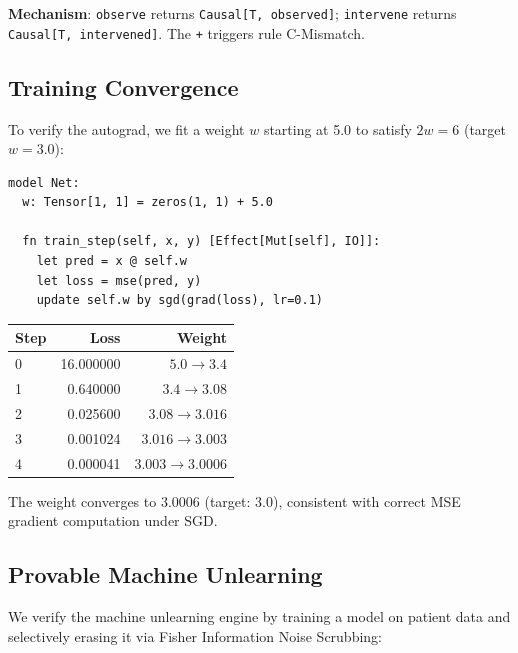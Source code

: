 \documentclass[11pt,a4paper]{article}
\newcommand{\ty}[1]{\texttt{#1}}
\begin{document}
\textbf{Mechanism}: \ty{observe} returns \ty{Causal[T, observed]}; \ty{intervene} returns \ty{Causal[T, intervened]}. The \ty{+} triggers rule C-Mismatch.

\subsection{Training Convergence}

To verify the autograd, we fit a weight $w$ starting at 5.0 to satisfy $2w = 6$ (target $w = 3.0$):

\begin{lstlisting}
model Net:
  w: Tensor[1, 1] = zeros(1, 1) + 5.0

  fn train_step(self, x, y) [Effect[Mut[self], IO]]:
    let pred = x @ self.w
    let loss = mse(pred, y)
    update self.w by sgd(grad(loss), lr=0.1)
\end{lstlisting}

\begin{center}
\begin{tabular}{lrr}
\toprule
\textbf{Step} & \textbf{Loss} & \textbf{Weight} \\
\midrule
0 & 16.000000 & $5.0 \to 3.4$ \\
1 & 0.640000 & $3.4 \to 3.08$ \\
2 & 0.025600 & $3.08 \to 3.016$ \\
3 & 0.001024 & $3.016 \to 3.003$ \\
4 & 0.000041 & $3.003 \to 3.0006$ \\
\bottomrule
\end{tabular}
\end{center}

The weight converges to 3.0006 (target: 3.0), consistent with correct MSE gradient computation under SGD.

\subsection{Provable Machine Unlearning}

We verify the machine unlearning engine by training a model on patient data and selectively erasing it via Fisher Information Noise Scrubbing:
\end{document}
